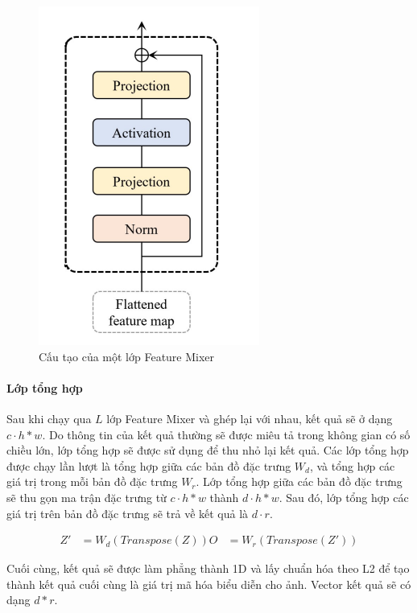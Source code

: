\begin{figure}[H]
    \centering
    \includegraphics[scale=0.75]{pics/Proposal/mixer.png}
    \caption{Cấu tạo của một lớp Feature Mixer \cite{alibey2023mixvpr}}
\end{figure}

\paragraph*{Lớp tổng hợp}

Sau khi chạy qua $L$ lớp Feature Mixer và ghép lại với nhau, kết quả sẽ ở dạng $c \cdot h*w$. Do thông tin của kết quả thường sẽ được miêu tả trong không gian có số chiều lớn, lớp tổng hợp sẽ được sử dụng để thu nhỏ lại kết quả. Các lớp tổng hợp được chạy lần lượt là tổng hợp giữa các bản đồ đặc trưng $W_d$, và tổng hợp các giá trị trong mỗi bản đồ đặc trưng $W_r$. Lớp tổng hợp giữa các bản đồ đặc trưng sẽ thu gọn ma trận đặc trưng từ $c \cdot h*w$ thành $d \cdot h*w$. Sau đó, lớp tổng hợp các giá trị trên bản đồ đặc trưng sẽ trả về kết quả là $d \cdot r$.

$$
\begin{aligned}
Z' &= W_d(Transpose(Z))
O &= W_r(Transpose(Z'))
\end{aligned}
$$

Cuối cùng, kết quả sẽ được làm phẳng thành 1D và lấy chuẩn hóa theo L2 để tạo thành kết quả cuối cùng là giá trị mã hóa biểu diễn cho ảnh. Vector kết quả sẽ có dạng $d*r$.

